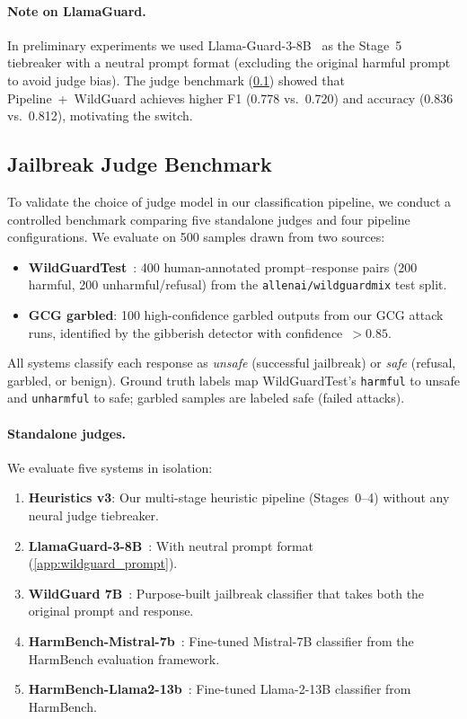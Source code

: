 \paragraph{Note on LlamaGuard.} In preliminary experiments we used Llama-Guard-3-8B~\citep{llamaguard} as the Stage~5 tiebreaker with a neutral prompt format (excluding the original harmful prompt to avoid judge bias). The judge benchmark (\cref{app:judge_benchmark}) showed that Pipeline~+~WildGuard achieves higher F1 (0.778 vs.\ 0.720) and accuracy (0.836 vs.\ 0.812), motivating the switch.

\subsection{Jailbreak Judge Benchmark}
\label{app:judge_benchmark}

To validate the choice of judge model in our classification pipeline, we conduct a controlled benchmark comparing five standalone judges and four pipeline configurations. We evaluate on 500 samples drawn from two sources:

\begin{itemize}[nosep,leftmargin=*]
    \item \textbf{WildGuardTest}~\citep{wildguardmix}: 400 human-annotated prompt--response pairs (200 harmful, 200 unharmful/refusal) from the \texttt{allenai/wildguardmix} test split.
    \item \textbf{GCG garbled}: 100 high-confidence garbled outputs from our GCG attack runs, identified by the gibberish detector with confidence~$>0.85$.
\end{itemize}

All systems classify each response as \emph{unsafe} (successful jailbreak) or \emph{safe} (refusal, garbled, or benign). Ground truth labels map WildGuardTest's \texttt{harmful} to unsafe and \texttt{unharmful} to safe; garbled samples are labeled safe (failed attacks).

\paragraph{Standalone judges.} We evaluate five systems in isolation:
\begin{enumerate}[nosep,leftmargin=*]
    \item \textbf{Heuristics v3}: Our multi-stage heuristic pipeline (Stages~0--4) without any neural judge tiebreaker.
    \item \textbf{LlamaGuard-3-8B}~\citep{llamaguard}: With neutral prompt format (\cref{app:wildguard_prompt}).
    \item \textbf{WildGuard 7B}~\citep{wildguardmix}: Purpose-built jailbreak classifier that takes both the original prompt and response.
    \item \textbf{HarmBench-Mistral-7b}~\citep{harmbench}: Fine-tuned Mistral-7B classifier from the HarmBench evaluation framework.
    \item \textbf{HarmBench-Llama2-13b}~\citep{harmbench}: Fine-tuned Llama-2-13B classifier from HarmBench.
\end{enumerate}

